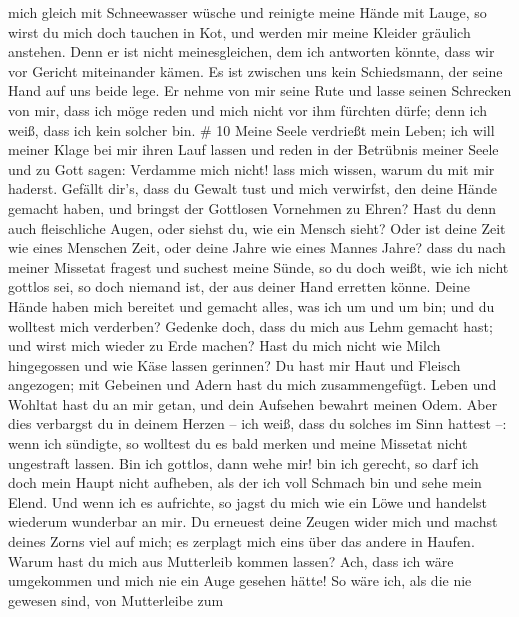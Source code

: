 mich gleich mit Schneewasser wüsche und reinigte meine Hände mit Lauge,
 so wirst du mich doch tauchen in Kot, und werden mir meine
Kleider gräulich anstehen.  Denn er ist nicht
meinesgleichen, dem ich antworten könnte, dass wir vor Gericht
miteinander kämen.  Es ist zwischen uns kein Schiedsmann,
der seine Hand auf uns beide lege.  Er nehme von mir seine
Rute und lasse seinen Schrecken von mir,  dass ich möge
reden und mich nicht vor ihm fürchten dürfe; denn ich weiß, dass ich
kein solcher bin. \# 10  Meine Seele verdrießt mein Leben;
ich will meiner Klage bei mir ihren Lauf lassen und reden in der
Betrübnis meiner Seele  und zu Gott sagen: Verdamme mich
nicht! lass mich wissen, warum du mit mir haderst.  Gefällt
dir's, dass du Gewalt tust und mich verwirfst, den deine Hände gemacht
haben, und bringst der Gottlosen Vornehmen zu Ehren?  Hast
du denn auch fleischliche Augen, oder siehst du, wie ein Mensch sieht?
 Oder ist deine Zeit wie eines Menschen Zeit, oder deine
Jahre wie eines Mannes Jahre?  dass du nach meiner Missetat
fragest und suchest meine Sünde,  so du doch weißt, wie ich
nicht gottlos sei, so doch niemand ist, der aus deiner Hand erretten
könne.  Deine Hände haben mich bereitet und gemacht alles,
was ich um und um bin; und du wolltest mich verderben? 
Gedenke doch, dass du mich aus Lehm gemacht hast; und wirst mich wieder
zu Erde machen?  Hast du mich nicht wie Milch hingegossen
und wie Käse lassen gerinnen?  Du hast mir Haut und Fleisch
angezogen; mit Gebeinen und Adern hast du mich zusammengefügt.
 Leben und Wohltat hast du an mir getan, und dein Aufsehen
bewahrt meinen Odem.  Aber dies verbargst du in deinem
Herzen -- ich weiß, dass du solches im Sinn hattest --: 
wenn ich sündigte, so wolltest du es bald merken und meine Missetat
nicht ungestraft lassen.  Bin ich gottlos, dann wehe mir!
bin ich gerecht, so darf ich doch mein Haupt nicht aufheben, als der ich
voll Schmach bin und sehe mein Elend.  Und wenn ich es
aufrichte, so jagst du mich wie ein Löwe und handelst wiederum wunderbar
an mir.  Du erneuest deine Zeugen wider mich und machst
deines Zorns viel auf mich; es zerplagt mich eins über das andere in
Haufen.  Warum hast du mich aus Mutterleib kommen lassen?
Ach, dass ich wäre umgekommen und mich nie ein Auge gesehen hätte!
 So wäre ich, als die nie gewesen sind, von Mutterleibe zum
